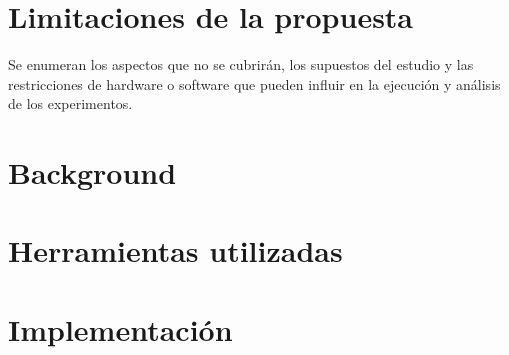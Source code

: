 \section{Limitaciones de la propuesta}\label{sec:limitaciones_propuesta}
Se enumeran los aspectos que no se cubrirán, los supuestos del estudio y las restricciones de hardware o software que pueden influir en la ejecución y análisis de los experimentos.


\section{Background}

\section{Herramientas utilizadas}

\section{Implementación}